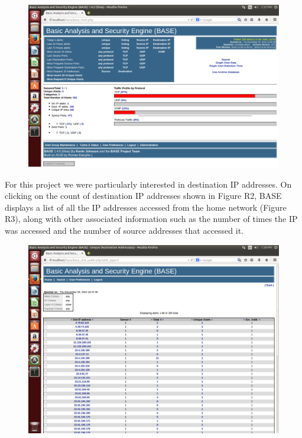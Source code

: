 \begin{figure}
\includegraphics{figures/R2_BASE_Main}
\end{figure}

For this project we were particularly interested in destination IP
addresses. 
%
On clicking on the count of destination IP addresses shown
in Figure R2, BASE displays a list of all the IP addresses accessed
from the home network (Figure R3), along with other associated
information such as the number of times the IP was accessed and the
number of source addresses that accessed it.

\begin{figure}
\includegraphics{figures/R3_BASE_IPList}
\end{figure}

